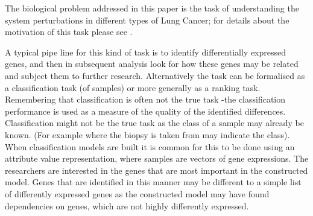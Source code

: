 \documentclass[runningheads,a4paper]{llncs}
\begin{document}
The biological problem addressed in this paper is the task of  understanding the system perturbations in different types of Lung Cancer; for details about the motivation of this task please see \citep{rhrissorrakrai_sbv_2013}.





A typical pipe line for this kind of task is to identify differentially expressed genes, and then in subsequent analysis look for how these genes may be related and subject them to further research.  
Alternatively the task can be formalised as a classification task (of samples) or more generally as a ranking task. 
Remembering that classification is often not the true task -the classification performance is used as a measure of the quality of the identified differences. Classification might not be the true task as the class of a sample may already be known. (For example where the biopsy is taken from may indicate the class). When classification models are built it is common for this to be done using an attribute value representation, where samples are vectors of gene expressions. The researchers are interested in the genes that are most important in the constructed model. Genes that are identified in this manner may be  different to a simple list of differently expressed genes as the constructed model may have found dependencies on genes, which are not highly differently expressed. 
\end{document}
